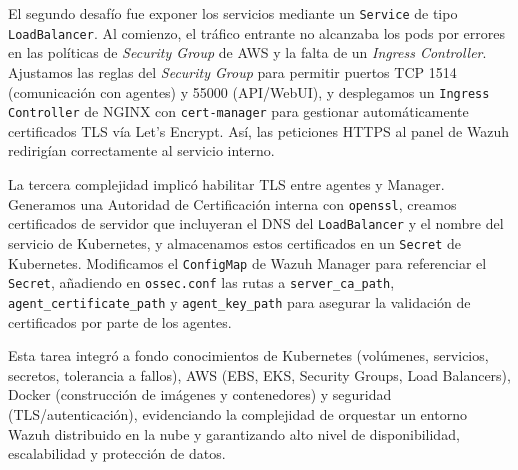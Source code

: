El segundo desafío fue exponer los servicios mediante un \texttt{Service} de tipo \texttt{LoadBalancer}\cite{AWS:EKS:LoadBalancing:2025}. Al comienzo, el tráfico entrante no alcanzaba los pods por errores en las políticas de \emph{Security Group} de AWS\cite{AWS:EKS:SecurityGroups:2025} y la falta de un \emph{Ingress Controller}\cite{K8s:Ingress:CertManager:2025}. Ajustamos las reglas del \emph{Security Group} para permitir puertos TCP 1514 (comunicación con agentes) y 55000 (API/WebUI), y desplegamos un \texttt{Ingress Controller} de NGINX con \texttt{cert-manager} para gestionar automáticamente certificados TLS vía Let’s Encrypt\cite{K8s:Ingress:CertManager:2025}\cite{Wazuh:Dashboard:TLS:2025}. Así, las peticiones HTTPS al panel de Wazuh redirigían correctamente al servicio interno.

La tercera complejidad implicó habilitar TLS entre agentes y Manager\cite{Wazuh:Agent:TLS:2025}. Generamos una Autoridad de Certificación interna con \texttt{openssl}, creamos certificados de servidor que incluyeran el DNS del \texttt{LoadBalancer} y el nombre del servicio de Kubernetes, y almacenamos estos certificados en un \texttt{Secret} de Kubernetes\cite{K8s:Secret:TLS:2025}. Modificamos el \texttt{ConfigMap} de Wazuh Manager para referenciar el \texttt{Secret}, añadiendo en \texttt{ossec.conf} las rutas a \texttt{server\_ca\_path}, \texttt{agent\_certificate\_path} y \texttt{agent\_key\_path} para asegurar la validación de certificados por parte de los agentes\cite{Wazuh:Agent:Config:2025}.

Esta tarea integró a fondo conocimientos de Kubernetes (volúmenes, servicios, secretos, tolerancia a fallos)\cite{Wazuh:Kubernetes:Manifests:2024}, AWS (EBS, EKS, Security Groups, Load Balancers)\cite{AWS:EKS:SecurityGroups:2025}\cite{AWS:EKS:LoadBalancing:2025}, Docker (construcción de imágenes y contenedores) y seguridad (TLS/autenticación)\cite{Wazuh:Agent:TLS:2025}, evidenciando la complejidad de orquestar un entorno Wazuh distribuido en la nube y garantizando alto nivel de disponibilidad, escalabilidad y protección de datos.


